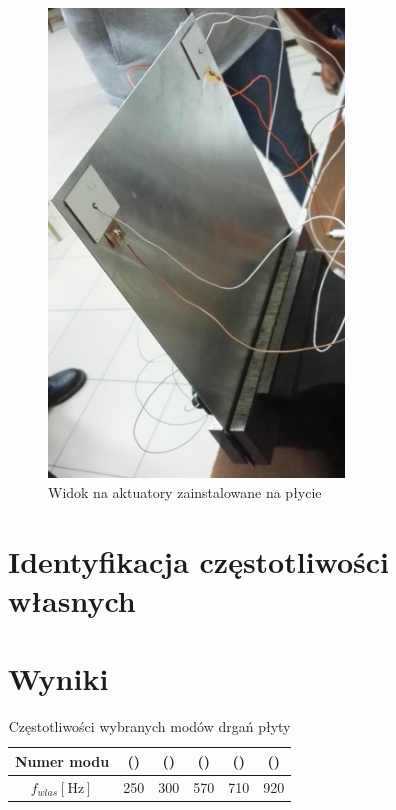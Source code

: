 \documentclass[polish,a4paper,11pt]{mwart}
\let\Oldsection\section
\renewcommand{\section}{\FloatBarrier\Oldsection}
\begin{document}
\begin{figure}[!tbh]
  \centering
  \includegraphics[width=0.7\textwidth]{./bitgraphics/plate2.jpg}
  \caption{Widok na aktuatory zainstalowane na płycie}
  \label{fig:plate2}
\end{figure}

\section{Identyfikacja częstotliwości własnych}


\section{Wyniki}

\begin{table}[!tbh]
  \centering
  \caption{Częstotliwości wybranych modów drgań płyty}
  \begin{tabular}{|c|c|c|c|c|c|}
    \hline
    Numer modu & () & () & () & () & () \\
    \hline
    $f_{wlas} [\si{\hertz}]$ & 250 & 300 & 570 & 710 & 920\\
    \hline
  \end{tabular}
  \label{tab:czest}
\end{table}
\end{document}
